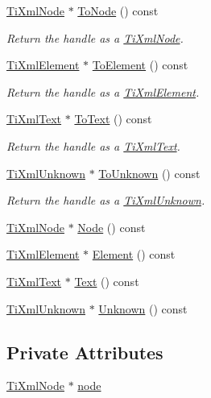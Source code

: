\begin{DoxyCompactItemize}
\hyperlink{class_ti_xml_node}{TiXmlNode} $\ast$ \hyperlink{class_ti_xml_handle_af678e5088e83be67baf76f699756f2c3}{ToNode} () const 
\begin{DoxyCompactList}\small\item\em Return the handle as a \hyperlink{class_ti_xml_node}{TiXmlNode}. \end{DoxyCompactList}\item 
\hyperlink{class_ti_xml_element}{TiXmlElement} $\ast$ \hyperlink{class_ti_xml_handle_abc6e7ed383a5fe1e52b0c0004b457b9e}{ToElement} () const 
\begin{DoxyCompactList}\small\item\em Return the handle as a \hyperlink{class_ti_xml_element}{TiXmlElement}. \end{DoxyCompactList}\item 
\hyperlink{class_ti_xml_text}{TiXmlText} $\ast$ \hyperlink{class_ti_xml_handle_a4ac53a652296203a5b5e13854d923586}{ToText} () const 
\begin{DoxyCompactList}\small\item\em Return the handle as a \hyperlink{class_ti_xml_text}{TiXmlText}. \end{DoxyCompactList}\item 
\hyperlink{class_ti_xml_unknown}{TiXmlUnknown} $\ast$ \hyperlink{class_ti_xml_handle_a1381c17507a130767b1e23afc93b3674}{ToUnknown} () const 
\begin{DoxyCompactList}\small\item\em Return the handle as a \hyperlink{class_ti_xml_unknown}{TiXmlUnknown}. \end{DoxyCompactList}\item 
\hyperlink{class_ti_xml_node}{TiXmlNode} $\ast$ \hyperlink{class_ti_xml_handle_ab44b723a8dc9af72838a303c079d0376}{Node} () const 
\item 
\hyperlink{class_ti_xml_element}{TiXmlElement} $\ast$ \hyperlink{class_ti_xml_handle_acb5fe8388a526289ea65e817a51e05e7}{Element} () const 
\item 
\hyperlink{class_ti_xml_text}{TiXmlText} $\ast$ \hyperlink{class_ti_xml_handle_a9fc739c8a18d160006f82572fc143d13}{Text} () const 
\item 
\hyperlink{class_ti_xml_unknown}{TiXmlUnknown} $\ast$ \hyperlink{class_ti_xml_handle_a49675b74357ba2aae124657a9a1ef465}{Unknown} () const 
\end{DoxyCompactItemize}
\subsection*{Private Attributes}
\begin{DoxyCompactItemize}
\item 
\hyperlink{class_ti_xml_node}{TiXmlNode} $\ast$ \hyperlink{class_ti_xml_handle_ac5429de14bb78b16288bac5bf33c6858}{node}
\end{DoxyCompactItemize}


